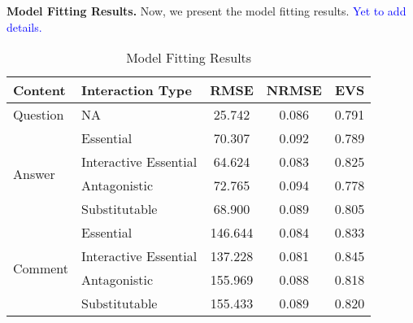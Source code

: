 \textbf{Model Fitting Results.} 
Now, we present the model fitting results. \textcolor{blue}{Yet to add details.}

\begin{table}[ht]
	\vspace{-0.5\baselineskip}
	\caption{Model Fitting Results}
    \vspace{-\baselineskip}
	\label{tbl:model_fit}
	\begin{center}
	\begin{tabular}{llccc}
    \toprule
    Content & Interaction Type & RMSE & NRMSE & EVS\\
    \midrule
    Question & NA & 25.742 & 0.086 & 0.791\\
    \midrule
    \multirow{4}{*}{Answer} & Essential & 70.307 & 0.092 & 0.789\\
    & Interactive Essential & 64.624 & 0.083 & 0.825\\
    & Antagonistic & 72.765 & 0.094 &  0.778\\
    & Substitutable & 68.900 & 0.089 & 0.805\\
    \midrule
    \multirow{4}{*}{Comment} & Essential & 146.644 & 0.084 & 0.833\\
    & Interactive Essential & 137.228 & 0.081 & 0.845\\
    & Antagonistic & 155.969 & 0.088 &  0.818\\
    & Substitutable & 155.433 & 0.089 & 0.820\\
    \bottomrule
	\end{tabular}
	\end{center}
    \vspace{-\baselineskip}
\end{table}
 


